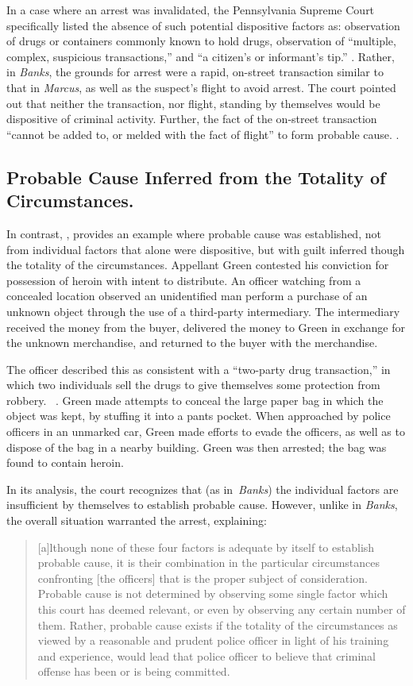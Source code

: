 \documentclass[12pt]{lawmemo}
\begin{document}
In a case where an arrest was invalidated, the Pennsylvania Supreme Court
specifically listed the absence of such potential dispositive factors as:
observation of drugs or containers commonly known to hold drugs, observation of
``multiple, complex, suspicious transactions,'' and ``a citizen's or
informant's tip.'' .  Rather, in \textit{Banks}, the
grounds for arrest were a rapid, on-street transaction similar to that in
\textit{Marcus}, as well as the suspect's flight to avoid arrest.  The court pointed
out that neither the transaction, nor flight, standing by themselves would be
dispositive of criminal activity.  Further, the fact of the on-street
transaction ``cannot be added to, or melded with the fact of flight'' to form
probable cause. .

\subsection{Probable Cause Inferred from the Totality of Circumstances.} In
contrast, \cite{Green}, provides an example where probable cause was
established, not from individual factors that alone were dispositive, but with
guilt inferred though the totality of the circumstances.  Appellant Green
contested his conviction for possession of heroin with intent to distribute.
An officer watching from a concealed location observed an unidentified man
perform a purchase of an unknown object through the use of a third-party
intermediary.  The intermediary received the money from the buyer, delivered
the money to Green in exchange for the unknown merchandise, and returned to the
buyer with the merchandise.  

The officer described this as consistent with a ``two-party drug transaction,''
in which two individuals sell the drugs to give themselves some protection from
robbery.  \See~.  Green made attempts to
conceal the large paper bag in which the object was kept, by stuffing it into a
pants pocket.  When approached by police officers in an unmarked car, Green
made efforts to evade the officers, as well as to dispose of the bag in a
nearby building.  Green was then arrested; the bag was found to contain heroin.

In its analysis, the court recognizes that (as in~\textit{Banks}) the individual
factors are insufficient by themselves to establish probable cause.  However,
unlike in \textit{Banks}, the overall situation warranted the
arrest, explaining:  \begin{quote} [a]lthough none of these four factors is adequate by itself to
establish probable cause, it is their combination in the particular
circumstances confronting [the officers] that is the proper subject
of consideration.  Probable cause is not determined by observing some single
factor which this court has deemed relevant, or even by observing any certain
number of them.  Rather, probable cause exists if the totality of the
circumstances as viewed by a reasonable and prudent police officer in light of
his training and experience, would lead that police officer to believe that
criminal offense has been or is being committed.  \end{quote}
\end{document}
